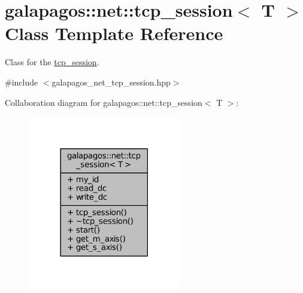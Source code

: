 \hypertarget{classgalapagos_1_1net_1_1tcp__session}{}\section{galapagos\+:\+:net\+:\+:tcp\+\_\+session$<$ T $>$ Class Template Reference}
\label{classgalapagos_1_1net_1_1tcp__session}


Class for the \hyperlink{classgalapagos_1_1net_1_1tcp__session}{tcp\+\_\+session}.  




{\ttfamily \#include $<$galapagos\+\_\+net\+\_\+tcp\+\_\+session.\+hpp$>$}



Collaboration diagram for galapagos\+:\+:net\+:\+:tcp\+\_\+session$<$ T $>$\+:
\nopagebreak
\begin{figure}[H]
\begin{center}
\leavevmode
\includegraphics[width=189pt]{classgalapagos_1_1net_1_1tcp__session__coll__graph}
\end{center}
\end{figure}
